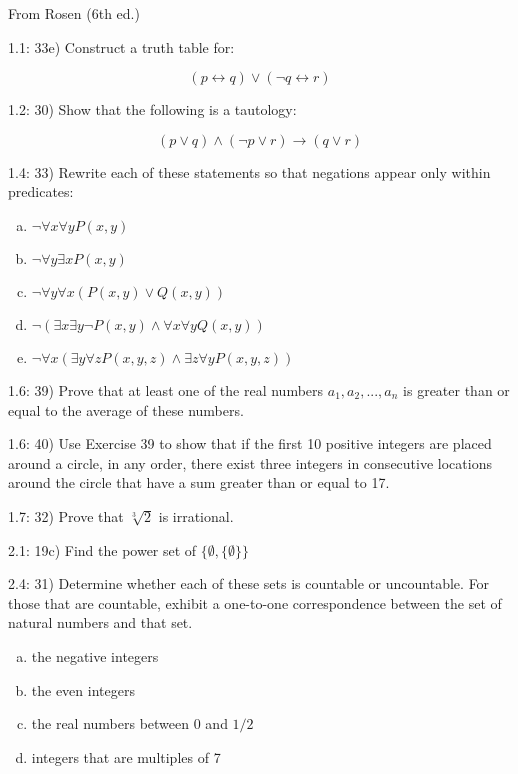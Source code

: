 \documentclass{report}
\begin{document}
From Rosen (6th ed.)

1.1: 33e) Construct a truth table for:

\[
(p \leftrightarrow q) \vee (\neg q \leftrightarrow r)
\]

1.2: 30) Show that the following is a tautology:

\[
(p \vee q) \wedge (\neg p \vee r) \rightarrow (q \vee r)
\]

1.4: 33) Rewrite each of these statements so that negations appear only within predicates:

\begin{enumerate}[a)]
\item $ \neg \forall x \forall y P(x,y) $
\item $ \neg \forall y \exists x P(x,y) $
\item $ \neg \forall y \forall x (P(x,y) \vee Q(x,y)) $
\item $ \neg ( \exists x \exists y \neg P(x,y) \wedge \forall x \forall y Q(x,y)) $
\item $ \neg \forall x ( \exists y \forall z P(x,y,z) \wedge \exists z \forall y P(x,y,z)) $
 \end{enumerate}

 1.6: 39) Prove that at least one of the real numbers $a_1,a_2,...,a_n$ is greater than or equal to the average of these numbers.

 1.6: 40) Use Exercise 39 to show that if the first 10 positive integers are placed around a circle, in any order, there exist three integers in consecutive locations around the circle that have a sum greater than or equal to 17.

 1.7: 32) Prove that $\sqrt[3]{2}$ is irrational.

 2.1: 19c) Find the power set of $ \{ \emptyset , \{ \emptyset \} \} $

 2.4: 31) Determine whether each of these sets is countable or uncountable.  For those that are countable, exhibit a one-to-one correspondence between the set of natural numbers and that set.

 \begin{enumerate}[a)]
 \item the negative integers
 \item the even integers
 \item the real numbers between 0 and $1/2$
 \item integers that are multiples of 7
 \end{enumerate}
\end{document}
